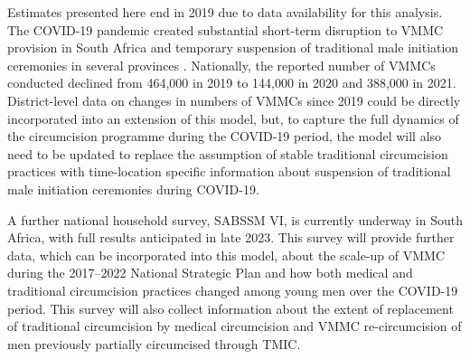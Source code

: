 \documentclass{article}
\begin{document}
Estimates presented here end in 2019 due to data availability for this analysis. The COVID-19 pandemic created substantial short-term disruption to VMMC provision in South Africa \autocite{peck2022effects} and temporary suspension of traditional male initiation ceremonies in several provinces \autocite{ewn2020circumcisionschools}. Nationally, the reported number of VMMCs conducted declined from 464,000 in 2019 to 144,000 in 2020 and 388,000 in 2021. District-level data on changes in numbers of VMMCs since 2019 could be directly incorporated into an extension of this model, but, to capture the full dynamics of the circumcision programme during the COVID-19 period, the model will also need to be updated to replace the assumption of stable traditional circumcision practices with time-location specific information about suspension of traditional male initiation ceremonies during COVID-19.

A further national household survey, SABSSM VI, is currently underway in South Africa, with full results anticipated in late 2023. This survey will provide further data, which can be incorporated into this model, about the scale-up of VMMC during the 2017--2022 National Strategic Plan and how both medical and traditional circumcision practices changed among young men over the COVID-19 period. This survey will also collect information about the extent of replacement of traditional circumcision by medical circumcision and VMMC re-circumcision of men previously partially circumcised through TMIC.
\end{document}
